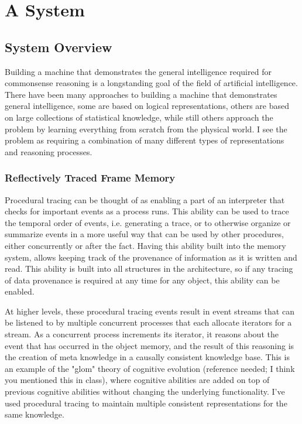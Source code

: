 \chapter{A System}\label{ch:a_system}

\section{System Overview}

Building a machine that demonstrates the general intelligence required
for commonsense reasoning is a longstanding goal of the field of
artificial intelligence.  There have been many approaches to building
a machine that demonstrates general intelligence, some are based on
logical representations, others are based on large collections of
statistical knowledge, while still others approach the problem by
learning everything from scratch from the physical world.  I see the
problem as requiring a combination of many different types of
representations and reasoning processes.



\subsection{Reflectively Traced Frame Memory}

Procedural tracing can be thought of as enabling a part of an
interpreter that checks for important events as a process runs.  This
ability can be used to trace the temporal order of events, i.e.
generating a trace, or to otherwise organize or summarize events in a
more useful way that can be used by other procedures, either
concurrently or after the fact.  Having this ability built into the
memory system, allows keeping track of the provenance of information as
it is written and read.  This ability is built into all structures in
the architecture, so if any tracing of data provenance is required at
any time for any object, this ability can be enabled.

At higher levels, these procedural tracing events result in event
streams that can be listened to by multiple concurrent processes that
each allocate iterators for a stream.  As a concurrent process
increments its iterator, it reasons about the event that has occurred in
the object memory, and the result of this reasoning is the creation of
meta knowledge in a causally consistent knowledge base.  This is an
example of the "glom" theory of cognitive evolution (reference needed; I
think you mentioned this in class), where cognitive abilities are added
on top of previous cognitive abilities without changing the underlying
functionality.  I've used procedural tracing to maintain multiple
consistent representations for the same knowledge.

